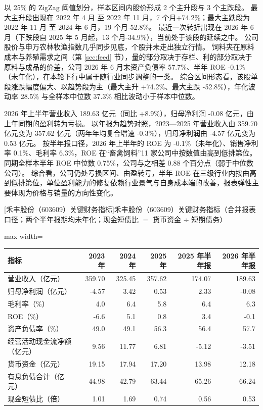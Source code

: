  以 25\% 的 ZigZag 阈值划分，样本区间内股价形成 2 个主升段与 3 个主跌段。 最大主升段出现在 2022 年 4 月 至 2022 年 11 月，7 个月+74.2\%；最大主跌段为 2022 年 11 月 至 2024 年 6 月，19 个月-52.8\%。 最近一次转折出现在 2026 年 6 月（下跌段自 2025 年 5 月起，13 个月-34.9\%），当前处于该段的延续之中。 公司股价与申万农林牧渔指数几乎同步见底，个股并未走出独立行情。 饲料夹在原料成本与养殖需求之间（第 \ref{sec:feed} 节），量的部分取决于存栏、利的部分取决于原料与成品的价差，公司 2026 年 6 月末资产负债率 57.7\%、半年 ROE -0.1\%（未年化），在本轮下行中属于随行业同步调整的一类。 综合区间形态看，该股单段涨跌幅度偏大、以趋势段为主（最大主升 +74.2\%、最大主跌 -52.8\%），年化波动率 28.5\% 与全样本中位数 37.3\% 相比波动小于样本中位数。

 2026 年上半年营业收入 189.63 亿元（同比 +8.9\%），归母净利润 -0.08 亿元，由上年同期的盈利转为亏损。 以年报为趋势对照，2023---2025 年营业收入由 359.70 亿元变为 357.62 亿元（两年年均复合增速 -0.3\%），归母净利润由 -4.57 亿元变为 0.53 亿元。 按半年报口径，2026 年上半年的 ROE 为 -0.1\%（未年化）、销售净利率 0.1\%、毛利率 6.3\%，ROE 在“畜禽饲料”11 家公司中按数值由高到低排第位。 同期全样本半年 ROE 中位数 0.75\%，公司与之相差 0.88 个百分点（弱于中位数公司）。 综合看，公司仍处亏损区间、由盈转亏，半年 ROE 在三级行业内按由高到低排第位，单位盈利能力的修复依赖行业景气与自身成本端的改善，报表弹性主要体现为价格与销量的方向性变化。

\begin{center}\small\setlength{\tabcolsep}{3.4pt}
[禾丰股份（603609）关键财务指标]{禾丰股份（603609）关键财务指标（合并报表口径；两个半年报期均未年化；现金短债比 $=$ 货币资金 $\div$ 短期债务）}
\begin{adjustbox}{max width=\textwidth}
\begin{tabular}{@{}lrrrrr@{}}
\toprule
指标 & 2023 年 & 2024 年 & 2025 年 & 2025 年半年报 & 2026 年半年报 \\
\midrule
营业收入（亿元） & 359.70 & 325.45 & 357.62 & 174.07 & 189.63 \\
归母净利润（亿元） & -4.57 & 3.42 & 0.53 & 2.33 & -0.08 \\
毛利率（\%） & 4.0 & 6.4 & 5.8 & 6.4 & 6.3 \\
ROE（\%） & -6.6 & 5.1 & 0.8 & 3.4 & -0.1 \\
资产负债率（\%） & 49.0 & 49.1 & 56.3 & 56.4 & 57.7 \\
经营活动现金流净额（亿元） & 9.56 & 11.77 & 6.81 & -5.12 & -3.51 \\
货币资金（亿元） & 19.15 & 17.94 & 17.20 & 13.98 & 12.18 \\
有息负债合计（亿元） & 44.98 & 42.79 & 63.44 & 65.26 & 66.24 \\
现金短债比（倍） & 1.01 & 1.69 & 0.74 & 0.56 & 0.53 \\
\bottomrule
\end{tabular}
\end{adjustbox}
\end{center}

